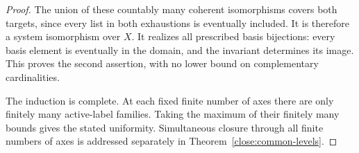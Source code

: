 \begin{proof}
The union of these countably many coherent isomorphisms covers
both targets, since every list in both exhaustions is eventually
included.  It is therefore a system isomorphism over $X$.
It realizes all prescribed basis bijections: every basis element
is eventually in the domain, and the invariant determines its
image.  This proves the second assertion, with no lower bound
on complementary cardinalities.

The induction is complete.  At each fixed finite number of axes
there are only finitely many active-label families.  Taking the
maximum of their finitely many bounds gives the stated
uniformity.  Simultaneous closure through all finite numbers of
axes is addressed separately in
Theorem~\ref{close:common-levels}.
\end{proof}

